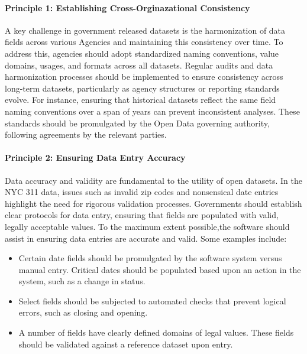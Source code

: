 \documentclass[linenumber]{jdsart}
\begin{document}
\paragraph{Principle 1: Establishing Cross-Orginazational Consistency}
A key challenge in government released datasets is the 
harmonization of data fields across various Agencies and 
maintaining this consistency over time. To address this, agencies should adopt 
standardized naming conventions, value domains, usages, and 
formats across all datasets. Regular audits and data harmonization 
processes should be implemented to ensure consistency 
across long-term datasets, particularly as agency structures 
or reporting standards evolve. For instance, ensuring that 
historical datasets reflect the same field naming conventions 
over a span of years can prevent inconsistent analyses. 
These standards should be promulgated by the Open Data 
governing authority, following agreements by the relevant parties.

\paragraph{Principle 2: Ensuring Data Entry Accuracy}
Data accuracy and validity are fundamental to the utility of 
open datasets. In the NYC 311 data, issues such as 
invalid zip codes and nonsensical date entries 
highlight the need for rigorous validation processes. Governments 
should establish clear protocols for data entry, ensuring that 
fields are populated with valid, legally acceptable values. To 
the maximum extent possible,the software should assist in 
ensuring data entries are accurate and valid. Some examples include:

\begin{itemize}[left=1.5em]
    \item Certain date fields should be promulgated by the software
    system versus manual entry. Critical dates should be populated
    based upon an action in the system, such as a change in status. 
       
    \item Select fields should be subjected to automated checks 
    that prevent logical errors, such as closing and opening. 
    
    \item A number of fields have clearly defined domains of legal
    values. These fields should be validated against a reference 
    dataset upon entry. 
 \end{itemize}
\end{document}
